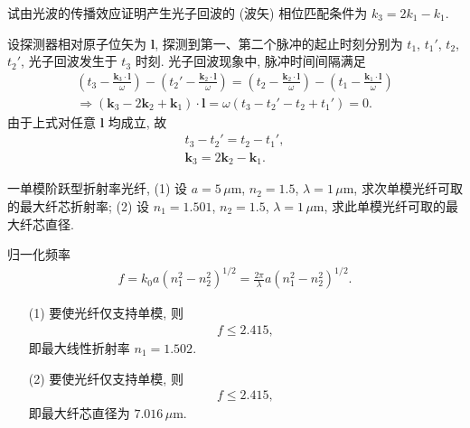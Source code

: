 \documentclass{assignment}
\begin{document}
\begin{prob}
    试由光波的传播效应证明产生光子回波的 (波矢) 相位匹配条件为 $k_3=2k_1-k_1$.
\end{prob}
\begin{pf}
    设探测器相对原子位矢为 $\bm{l}$, 探测到第一、第二个脉冲的起止时刻分别为 $t_1$, $t_1'$, $t_2$, $t_2'$, 光子回波发生于 $t_3$ 时刻.
    光子回波现象中, 脉冲时间间隔满足
    \begin{gather}
        \left(t_3-\frac{\bm{k}_3\cdot\bm{l}}{\omega}\right)-\left(t_2'-\frac{\bm{k}_2\cdot\bm{l}}{\omega}\right)=\left(t_2-\frac{\bm{k}_2\cdot\bm{l}}{\omega}\right)-\left(t_1-\frac{\bm{k}_1\cdot\bm{l}}{\omega}\right)\\
        \Longrightarrow(\bm{k}_3-2\bm{k}_2+\bm{k}_1)\cdot\bm{l}=\omega(t_3-t_2'-t_2+t_1')=0.
    \end{gather}
    由于上式对任意 $\bm{l}$ 均成立, 故
    \begin{gather}
        t_3-t_2'=t_2-t_1',\\
        \bm{k}_3=2\bm{k}_2-\bm{k}_1.
    \end{gather}
\end{pf}

\begin{prob}
    一单模阶跃型折射率光纤, (1) 设 $a=5\,\mu$m, $n_2=1.5$, $\lambda=1\,\mu$m, 求次单模光纤可取的最大纤芯折射率; (2) 设 $n_1=1.501$, $n_2=1.5$, $\lambda=1\,\mu$m, 求此单模光纤可取的最大纤芯直径.
\end{prob}
\begin{sol}
    归一化频率
    \begin{align}
        f=k_0a(n_1^2-n_2^2)^{1/2}=\frac{2\pi}{\lambda}a(n_1^2-n_2^2)^{1/2}.
    \end{align}
    \begin{itemize}
        \item[(1)] 要使光纤仅支持单模, 则
        \begin{align}
            f\leq 2.415,
        \end{align}
        即最大线性折射率 $n_1=1.502$.
        \item[(2)] 要使光纤仅支持单模, 则
        \begin{align}
            f\leq 2.415,
        \end{align}
        即最大纤芯直径为 $7.016\,\mu$m.
    \end{itemize}
\end{sol}
\end{document}
